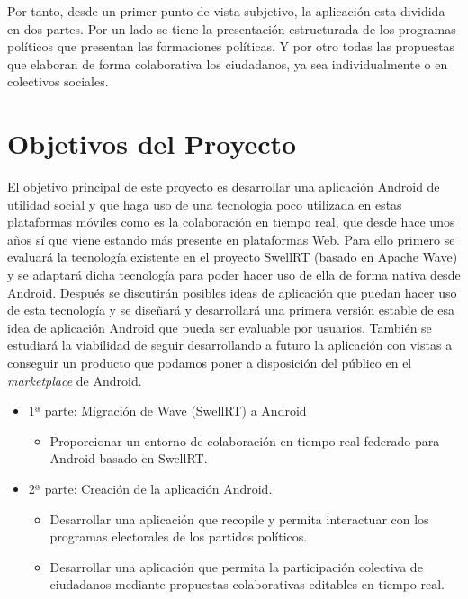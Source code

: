 	Por tanto, desde un primer punto de vista subjetivo, la aplicación esta dividida en dos partes. Por un lado se tiene la presentación estructurada de los programas políticos que presentan las formaciones políticas. Y por otro todas las propuestas que elaboran de forma colaborativa los ciudadanos, ya sea individualmente o en colectivos sociales.

 
\section{Objetivos del Proyecto} \label{sec:projectObjectives}

El objetivo principal de este proyecto es desarrollar una aplicación Android de utilidad social y que haga uso de una tecnología poco utilizada en estas plataformas móviles como es la colaboración en tiempo real, que desde hace unos años sí que viene estando más presente en plataformas Web. Para ello primero se evaluará la tecnología existente en el proyecto SwellRT (basado en Apache Wave) y se adaptará dicha tecnología para poder hacer uso de ella de forma nativa desde Android. Después se discutirán posibles ideas de aplicación que puedan hacer uso de esta tecnología y se diseñará y desarrollará una primera versión estable de esa idea de aplicación Android que pueda ser evaluable por usuarios. También se estudiará la viabilidad de seguir desarrollando a futuro la aplicación con vistas a conseguir un producto que podamos poner a disposición del público en el \textit{marketplace} de Android.

\begin{itemize}
  \item {
    1ª parte: Migración de Wave (SwellRT) a Android
    \begin{itemize}
      \item Proporcionar un entorno de colaboración en tiempo real federado para Android basado en SwellRT.
    \end{itemize}
  }
  \item {
    2ª parte: Creación de la aplicación Android.
    \begin{itemize}
      \item Desarrollar una aplicación que recopile y permita interactuar con los programas electorales de los partidos políticos.
      \item Desarrollar una aplicación que permita la participación colectiva de ciudadanos mediante propuestas colaborativas editables en tiempo real.
    \end{itemize}
  }
\end{itemize}

